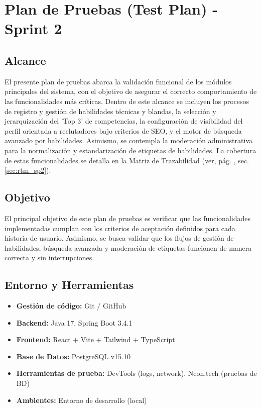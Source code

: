 \section{Plan de Pruebas (Test Plan) - Sprint 2}
\label{sec:plan_pruebas_sp2}

\subsection{Alcance}
El presente plan de pruebas abarca la validación funcional de los módulos principales del sistema, con el objetivo de asegurar el correcto comportamiento de las funcionalidades más críticas. Dentro de este alcance se incluyen los procesos de registro y gestión de habilidades técnicas y blandas, la selección y jerarquización del 'Top 3' de competencias, la configuración de visibilidad del perfil orientada a reclutadores bajo criterios de SEO, y el motor de búsqueda avanzado por habilidades. Asimismo, se contempla la moderación administrativa para la normalización y estandarización de etiquetas de habilidades. La cobertura de estas funcionalidades se detalla en la Matriz de Trazabilidad (ver, pág. \pageref{sec:rtm_sp2}, sec. \ref{sec:rtm_sp2}).

\subsection{Objetivo}
El principal objetivo de este plan de pruebas es verificar que las funcionalidades implementadas cumplan con los criterios de aceptación definidos para cada historia de usuario. Asimismo, se busca validar que los flujos de gestión de habilidades, búsqueda avanzada y moderación de etiquetas funcionen de manera correcta y sin interrupciones.

\subsection{Entorno y Herramientas}
\begin{itemize}[noitemsep]
    \item \textbf{Gestión de código:} Git / GitHub
    \item \textbf{Backend:} Java 17, Spring Boot 3.4.1
    \item \textbf{Frontend:} React + Vite + Tailwind + TypeScript
    \item \textbf{Base de Datos:} PostgreSQL v15.10
    \item \textbf{Herramientas de prueba:} DevTools (logs, network), Neon.tech (pruebas de BD)
    \item \textbf{Ambientes:} Entorno de desarrollo (local)
\end{itemize}

